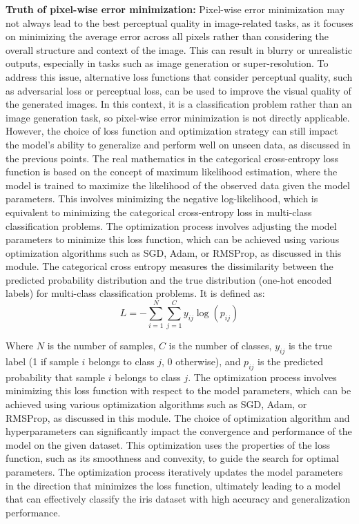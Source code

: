 \documentclass[
  letterpaper,
  DIV=11,
  numbers=noendperiod]{scrreprt}
\begin{document}
\textbf{Truth of pixel-wise error minimization:} Pixel-wise error
minimization may not always lead to the best perceptual quality in
image-related tasks, as it focuses on minimizing the average error
across all pixels rather than considering the overall structure and
context of the image. This can result in blurry or unrealistic outputs,
especially in tasks such as image generation or super-resolution. To
address this issue, alternative loss functions that consider perceptual
quality, such as adversarial loss or perceptual loss, can be used to
improve the visual quality of the generated images. In this context, it
is a classification problem rather than an image generation task, so
pixel-wise error minimization is not directly applicable. However, the
choice of loss function and optimization strategy can still impact the
model's ability to generalize and perform well on unseen data, as
discussed in the previous points. The real mathematics in the
categorical cross-entropy loss function is based on the concept of
maximum likelihood estimation, where the model is trained to maximize
the likelihood of the observed data given the model parameters. This
involves minimizing the negative log-likelihood, which is equivalent to
minimizing the categorical cross-entropy loss in multi-class
classification problems. The optimization process involves adjusting the
model parameters to minimize this loss function, which can be achieved
using various optimization algorithms such as SGD, Adam, or RMSProp, as
discussed in this module. The categorical cross entropy measures the
dissimilarity between the predicted probability distribution and the
true distribution (one-hot encoded labels) for multi-class
classification problems. It is defined as:
\[L = -\sum_{i=1}^{N} \sum_{j=1}^{C} y_{ij} \log(p_{ij})\]

Where \(N\) is the number of samples, \(C\) is the number of classes,
\(y_{ij}\) is the true label (1 if sample \(i\) belongs to class \(j\),
0 otherwise), and \(p_{ij}\) is the predicted probability that sample
\(i\) belongs to class \(j\). The optimization process involves
minimizing this loss function with respect to the model parameters,
which can be achieved using various optimization algorithms such as SGD,
Adam, or RMSProp, as discussed in this module. The choice of
optimization algorithm and hyperparameters can significantly impact the
convergence and performance of the model on the given dataset. This
optimization uses the properties of the loss function, such as its
smoothness and convexity, to guide the search for optimal parameters.
The optimization process iteratively updates the model parameters in the
direction that minimizes the loss function, ultimately leading to a
model that can effectively classify the iris dataset with high accuracy
and generalization performance.
\end{document}
